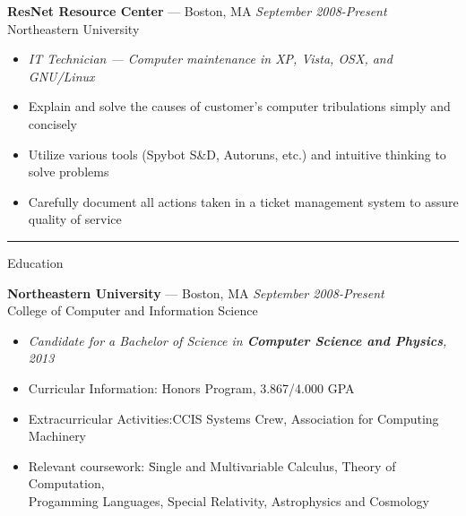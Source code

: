 \documentclass[10pt]{letter}
\begin{document}
\begin{tabbing}
{\large \bf ResNet Resource Center} --- Boston, MA \` \textit{September 2008-Present} \\
Northeastern University
\end{tabbing}\vspace{-10pt}

\begin{itemize}
\setlength\itemsep{1pt}
\item [] \textit{IT Technician --- Computer maintenance in XP, Vista, OSX, and GNU/Linux}
\item Explain and solve the causes of customer's computer tribulations simply and concisely
\item Utilize various tools (Spybot S\&D, Autoruns, etc.) and intuitive thinking to solve problems
\item Carefully document all actions taken in a ticket management system to assure quality of service
\end{itemize}
\rule{\linewidth}{.5pt}

{\Large Education}
\begin{tabbing}
{\large \bf Northeastern University} --- Boston, MA \` \textit{September 2008-Present} \\
College of Computer and Information Science
\end{tabbing}\vspace{-15pt}

\begin{itemize}
\setlength\itemsep{1pt}
\item[] \textit{Candidate for a Bachelor of Science in \textbf{Computer Science and Physics}, 2013}
\item Curricular Information:\hspace{.355in} Honors Program, 3.867/4.000 GPA
\item Extracurricular Activities:\hspace{.245in}CCIS Systems Crew, Association for Computing Machinery
\item \begin{tabbing}Relevant coursework:\hspace{.5in} \= Single and Multivariable Calculus, Theory of Computation,\\
  \> Progamming Languages, Special Relativity, Astrophysics and Cosmology\end{tabbing}
\end{itemize}
\end{document}
